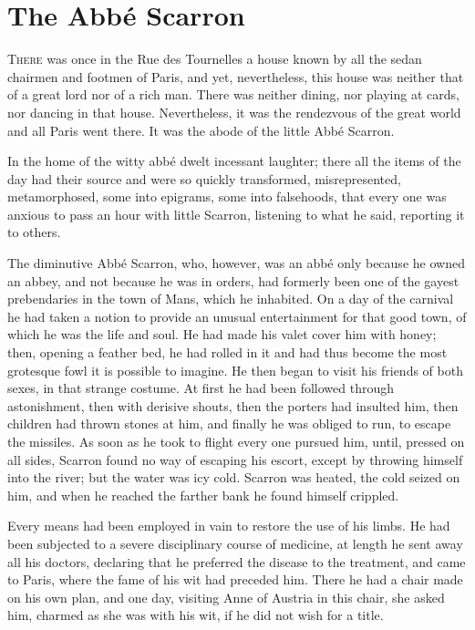 \chapter{The Abbé Scarron}

 \lettrine{T}{here} was once in the Rue des Tournelles a house known by all the sedan chairmen and footmen of Paris, and yet, nevertheless, this house was neither that of a great lord nor of a rich man. There was neither dining, nor playing at cards, nor dancing in that house. Nevertheless, it was the rendezvous of the great world and all Paris went there. It was the abode of the little Abbé Scarron.

In the home of the witty abbé dwelt incessant laughter; there all the items of the day had their source and were so quickly transformed, misrepresented, metamorphosed, some into epigrams, some into falsehoods, that every one was anxious to pass an hour with little Scarron, listening to what he said, reporting it to others.

The diminutive Abbé Scarron, who, however, was an abbé only because he owned an abbey, and not because he was in orders, had formerly been one of the gayest prebendaries in the town of Mans, which he inhabited. On a day of the carnival he had taken a notion to provide an unusual entertainment for that good town, of which he was the life and soul. He had made his valet cover him with honey; then, opening a feather bed, he had rolled in it and had thus become the most grotesque fowl it is possible to imagine. He then began to visit his friends of both sexes, in that strange costume. At first he had been followed through astonishment, then with derisive shouts, then the porters had insulted him, then children had thrown stones at him, and finally he was obliged to run, to escape the missiles. As soon as he took to flight every one pursued him, until, pressed on all sides, Scarron found no way of escaping his escort, except by throwing himself into the river; but the water was icy cold. Scarron was heated, the cold seized on him, and when he reached the farther bank he found himself crippled.

Every means had been employed in vain to restore the use of his limbs. He had been subjected to a severe disciplinary course of medicine, at length he sent away all his doctors, declaring that he preferred the disease to the treatment, and came to Paris, where the fame of his wit had preceded him. There he had a chair made on his own plan, and one day, visiting Anne of Austria in this chair, she asked him, charmed as she was with his wit, if he did not wish for a title.

